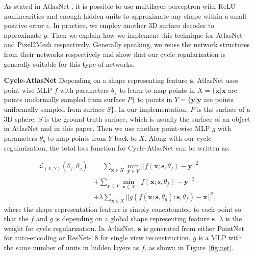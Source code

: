 As stated in AtlasNet \cite{atlasnet}, it is possible to use multilayer perceptron with ReLU nonlinearities and enough hidden units to approximate any shape within a small positive error $\epsilon$. In practice, we employ another 3D surface decoder to approximate $g$. Then we explain how we implement this technique for AtlasNet and Pixel2Mesh respectively. Generally speaking, we reuse the network structures from their networks respectively and show that our cycle regularization is generally suitable for this type of networks.

\noindent\textbf{Cycle-AtlasNet} Depending on a shape representing feature $\mathbf{s}$, AtlasNet uses point-wise MLP
$f$ with parameters $\theta_f$ to learn to map points in $X=\{\mathbf{x}| \mathbf{x}$ are points uniformally sampled from surface $P\}$ to points in $Y=\{\mathbf{y}| \mathbf{y}$ are points uniformally sampled from surface $S\}$. In our implementation, $P$ is the surface of a 3D sphere. $S$ is the ground truth surface, which is usually the surface of an object in AtlasNet \cite{atlasnet} and in this paper. Then we use another point-wise MLP $g$ with parameters $\theta_g$ to map points from $Y$ back to $X$. Along with our cycle regularization, the total loss function for Cycle-AtlasNet can be written as:

\begin{equation}
\begin{aligned}
\label{equ:atlascycle}
\mathcal{L}_{(X,Y)}(\theta_f,\theta_g) &= \sum_{\mathbf{x} \in X} \min_{\mathbf{y} \in Y}|| f(\mathbf{x};\mathbf{s},\theta_f) - \mathbf{y} ||^2 \\ &+ \sum_{ \mathbf{y} \in Y}\min_{ \mathbf{x} \in X} || f(\mathbf{x};\mathbf{s},\theta_f) - \mathbf{y} ||^2 \\ &+ \lambda\sum_{\mathbf{x} \in X}||g(f(\mathbf{x};\mathbf{s},\theta_g);\mathbf{s},\theta_f) - \mathbf{x}||^2,
\end{aligned}
 \end{equation}
where the shape representation feature is simply concatenated to each point so that the $f$ and $g$ is depending on a global shape representing feature $\mathbf{s}$. $\lambda$ is the weight for cycle regularization. In AtlasNet, $\mathbf{s}$ is generated from either PointNet \cite{resnet} for auto-encoding or ResNet-18 \cite{resnet} for single view reconstruction. $g$ is a MLP with the same number of units in hidden layers as $f$, as shown in Figure~\ref{fig:net}.


